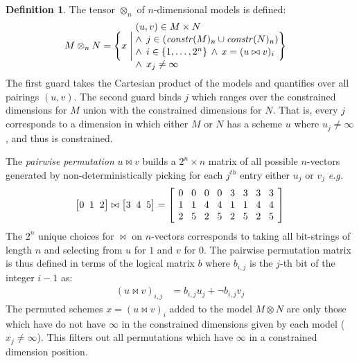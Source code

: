 \documentclass[9pt,preprint]{sigplanconf}
\newcounter{block}
\theoremstyle{definition}
\newtheorem{definition}[block]{Definition}
\newcommand{\eg}{\emph{e.g.}}
\newcommand{\vthreeh}[3]{\setlength{\arraycolsep}{0em}
\left[\begin{array}{ccc}#1 \; & \; #2 \; & \; #3\end{array}\right]}
\newcommand{\effdims}[2]{\mathit{constr}(#1)_{#2}}
\begin{document}
\begin{definition}The tensor $\otimes_n$ of $n$-dimensional
models is defined:
\begin{alignat*}{2}
& M \otimes_n N =
  \Bigg\{x \; \Bigg| \;
    \parbox{5.2cm}{$(u, v) \in M \times N $ \\[0.1em]
                 $\;\; \wedge \;\, j \in (\effdims{M}{n} \cup
                   \effdims{N}{n})$\\[0.1em]
                  $\;\; \wedge \;\, i \in \{1, \ldots, 2^n\} \, \wedge
                  \, x = (u \bowtie v)_i$ \\[0.1em]
                   $\;\; \wedge \;\, x_j \neq \infty$
                  } \Bigg\}
\end{alignat*}
The first guard takes the Cartesian product of
the models and quantifies over all pairings $(u, v)$.
The second guard binds $j$ which ranges over the constrained
dimensions for $M$ union with the constrained dimensions for $N$.
That is, every $j$ corresponds to a dimension in which
either $M$ or $N$ has a scheme $u$ where $u_j \neq \infty$,
and thus is constrained.

The \emph{pairwise permutation} $u \bowtie v$ 
builds a $2^n \times n$ matrix 
of all possible $n$-vectors generated by
non-deterministically picking for each $j^{th}$ entry either 
$u_j$ or $v_j$ \eg{}
%
\begin{equation*}
\vthreeh{0}{1}{2} \bowtie \vthreeh{3}{4}{5} =
\left[
\setlength{\arraycolsep}{0.42em}
\begin{array}{cccccccc}
0 & 0 & 0 & 0 & 3 & 3 & 3 & 3 \\
1 & 1 & 4 & 4 & 1 & 1 & 4 & 4 \\
2 & 5 & 2 & 5 & 2 & 5 & 2 & 5
\end{array}
\right]
\end{equation*}
%
The $2^n$ unique choices for $\bowtie$ on $n$-vectors
corresponds to taking all bit-strings of length $n$ and
selecting from $u$ for $1$ and $v$ for $0$. The pairwise permutation
matrix is thus defined in terms of the logical
matrix $b$ where $b_{i,j}$ is the $j$-th bit of the integer
$i - 1$ as:
%
\begin{align*}
(u \bowtie v)_{i,j} & = b_{i,j} u_j + \neg b_{i,j} v_j
\end{align*}
%
The permuted schemes $x = (u \bowtie v)_i$ added to the model 
$M \otimes N$ are only those which have do not have $\infty$ in 
the constrained dimensions given by each model ($x_j \neq
\infty$). This filters out all permutations which have
$\infty$ in a constrained dimension position. 
\end{definition}
\end{document}
